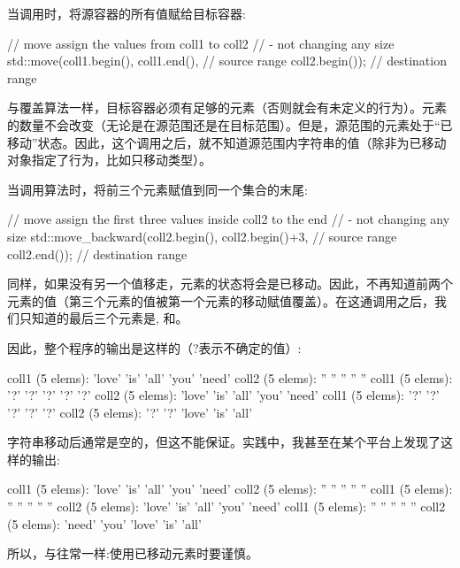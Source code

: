 当调用时，将源容器的所有值赋给目标容器:

\begin{cppcode}
// move assign the values from coll1 to coll2
// - not changing any size
std::move(coll1.begin(), coll1.end(), // source range
		  coll2.begin()); // destination range
\end{cppcode}

与覆盖算法一样，目标容器必须有足够的元素（否则就会有未定义的行为）。元素的数量不会改变（无论是在源范围还是在目标范围）。但是，源范围的元素处于“已移动”状态。因此，这个调用之后，就不知道源范围内字符串的值（除非为已移动对象指定了行为，比如只移动类型）。

当调用算法时，将前三个元素赋值到同一个集合的末尾:

\begin{cppcode}
// move assign the first three values inside coll2 to the end
// - not changing any size
std::move_backward(coll2.begin(), coll2.begin()+3, // source range
				   coll2.end()); // destination range
\end{cppcode}

同样，如果没有另一个值移走，元素的状态将会是已移动。因此，不再知道前两个元素的值（第三个元素的值被第一个元素的移动赋值覆盖）。在这通调用之后，我们只知道的最后三个元素是, 和。

因此，整个程序的输出是这样的（?表示不确定的值）:

\begin{outputcode}
coll1 (5 elems): 'love' 'is' 'all' 'you' 'need'
coll2 (5 elems): '' '' '' '' ''
coll1 (5 elems): '?' '?' '?' '?' '?'
coll2 (5 elems): 'love' 'is' 'all' 'you' 'need'
coll1 (5 elems): '?' '?' '?' '?' '?'
coll2 (5 elems): '?' '?' 'love' 'is' 'all'
\end{outputcode}

字符串移动后通常是空的，但这不能保证。实践中，我甚至在某个平台上发现了这样的输出:

\begin{outputcode}
coll1 (5 elems): 'love' 'is' 'all' 'you' 'need'
coll2 (5 elems): '' '' '' '' ''
coll1 (5 elems): '' '' '' '' ''
coll2 (5 elems): 'love' 'is' 'all' 'you' 'need'
coll1 (5 elems): '' '' '' '' ''
coll2 (5 elems): 'need' 'you' 'love' 'is' 'all'
\end{outputcode}


所以，与往常一样:使用已移动元素时要谨慎。

